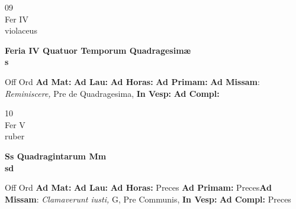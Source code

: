 \documentclass[10pt, openany]{book}
\begin{document}
    \begin{center}
        \begin{minipage}{3.5in}
            \vspace{2em}
            \begin{minipage}{0.5in}
                {\Huge 09} \\
                {\normalsize Fer IV} \\
                {\normalsize violaceus}
            \end{minipage}
            \begin{minipage}{3.0in}
                \textbf{ \large Feria IV Quatuor Temporum Quadragesimæ \\
                \textnormal{\normalsize s}} \\ 
            \end{minipage}
            \begin{justify}Off Ord
                \textbf{Ad Mat: }
                \textbf{Ad Lau: }
                \textbf{Ad Horas: }
                \textbf{Ad Primam: }\textbf{Ad Missam}: \textit{Reminiscere,} Pre de Quadragesima,  
                \textbf{In Vesp: }
                \textbf{Ad Compl: }
            \end{justify}
        \end{minipage}
    \end{center}

    \begin{center}
        \begin{minipage}{3.5in}
            \vspace{2em}
            \begin{minipage}{0.5in}
                {\Huge 10} \\
                {\normalsize Fer V} \\
                {\normalsize ruber}
            \end{minipage}
            \begin{minipage}{3.0in}
                \textbf{ \large Ss Quadragintarum Mm \\
                \textnormal{\normalsize sd}} \\ 
            \end{minipage}
            \begin{justify}Off Ord
                \textbf{Ad Mat: }
                \textbf{Ad Lau: }
                \textbf{Ad Horas: }Preces
                \textbf{Ad Primam: }Preces\textbf{Ad Missam}: \textit{Clamaverunt iusti,} G, Pre Communis,  
                \textbf{In Vesp: }
                \textbf{Ad Compl: }Preces
            \end{justify}
        \end{minipage}
    \end{center}
\end{document}
